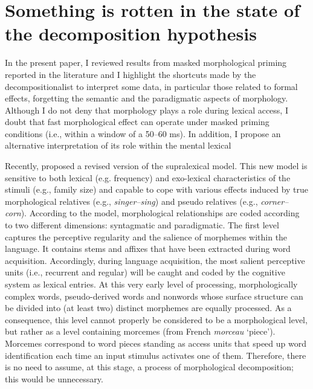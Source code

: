 \documentclass[output=paper]{langsci/langscibook}
\begin{document}
\section{Something is rotten in the state of the decomposition
hypothesis}\label{something-is-rotten-in-the-state-of-the-decomposition-hypothesis}

In the present paper, I reviewed results from masked morphological
priming reported in the literature and I highlight the shortcuts made
by the decompositionalist to interpret some data, in particular those
related to formal effects, forgetting the semantic and the paradigmatic
aspects of morphology. Although I do not deny that morphology plays a
role during lexical access, I doubt that fast morphological effect can
operate under masked priming conditions (i.e., within a window of a
50--60 ms). In addition, I propose an alternative interpretation of its
role within the mental lexical

Recently, %
\citet{GiraudoVoga2014} %
%
proposed a revised version of the
supralexical model. This new model is  sensitive to both lexical (e.g.
frequency) and exo-lexical characteristics of the stimuli (e.g., family
size) and capable to cope with various effects induced by true
morphological relatives (e.g., \emph{singer--sing}) and pseudo relatives
(e.g., \emph{corner--corn}). According to the model, morphological
relationships are coded according to two different dimensions:
syntagmatic and paradigmatic. The first level captures the perceptive
regularity and the salience of morphemes within the language. It
contains stems and affixes that have been extracted during word
acquisition. Accordingly, during language acquisition, the most salient
perceptive units (i.e., recurrent and regular) will be caught and coded
by the cognitive system as lexical entries. At this very early level of
processing, morphologically complex words, pseudo-derived words and
nonwords whose surface structure can be divided into (at least two)
distinct morphemes are equally processed. As a consequence, this level
cannot properly be considered to be a morphological level, but rather as
a level containing morcemes (from French \emph{morceau} `piece').
Morcemes correspond to word pieces standing as access units that speed
up word identification each time an input stimulus activates one of
them. Therefore, there is no need to assume, at this stage, a process of
morphological decomposition; this would be unnecessary.
\end{document}
